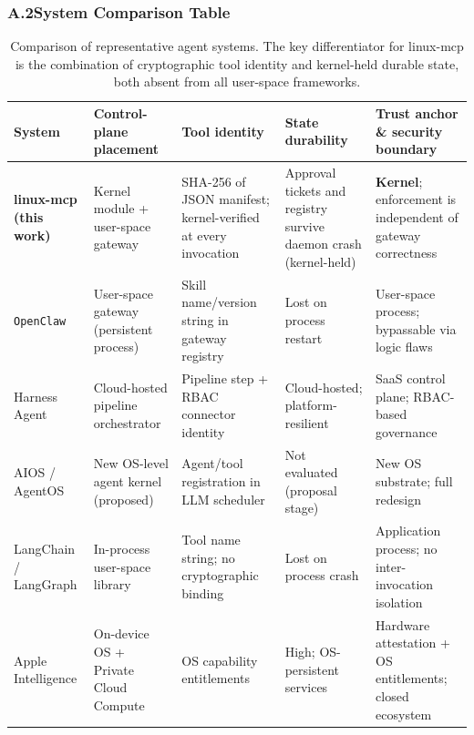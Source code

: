 \clearpage
\subsubsection*{A.2\quad System Comparison Table}
{}
\label{sec:appendix-comparison}

\begin{table}[H]
\centering
\caption{Comparison of representative agent systems. The key differentiator for linux-mcp is the combination of cryptographic tool identity and kernel-held durable state, both absent from all user-space frameworks.}
\label{tab:system_comparison}
\footnotesize
\renewcommand{\arraystretch}{1.35}
\setlength{\tabcolsep}{5pt}
\begin{tabular}{p{2.0cm} p{2.8cm} p{2.6cm} p{2.6cm} p{4.2cm}}
\toprule
\textbf{System}
  & \textbf{Control-plane placement}
  & \textbf{Tool identity}
  & \textbf{State durability}
  & \textbf{Trust anchor \& security boundary} \\
\midrule

\rowcolor{gray!12}
\textbf{linux-mcp} \newline\textbf{(this work)}
  & Kernel module + user-space gateway
  & SHA-256 of JSON manifest; kernel-verified at every invocation
  & Approval tickets and registry survive daemon crash (kernel-held)
  & \textbf{Kernel}; enforcement is independent of gateway correctness \\

\texttt{OpenClaw} \cite{openclaw2026}
  & User-space gateway (persistent process)
  & Skill name/version string in gateway registry
  & Lost on process restart
  & User-space process; bypassable via logic flaws \cite{openclaw_security1, openclaw_security2} \\

\rowcolor{gray!12}
Harness Agent \cite{harness2025}
  & Cloud-hosted pipeline orchestrator
  & Pipeline step + RBAC connector identity
  & Cloud-hosted; platform-resilient
  & SaaS control plane; RBAC-based governance \\

AIOS / AgentOS \cite{mei2024aios, liu2026agentos}
  & New OS-level agent kernel (proposed)
  & Agent/tool registration in LLM scheduler
  & Not evaluated (proposal stage)
  & New OS substrate; full redesign \\

\rowcolor{gray!12}
LangChain / LangGraph \cite{langchain2022, langgraph2024}
  & In-process user-space library
  & Tool name string; no cryptographic binding
  & Lost on process crash
  & Application process; no inter-invocation isolation \\

Apple Intelligence \cite{apple2024pcc}
  & On-device OS + Private Cloud Compute
  & OS capability entitlements
  & High; OS-persistent services
  & Hardware attestation + OS entitlements; closed ecosystem \\

\bottomrule
\end{tabular}
\end{table}


